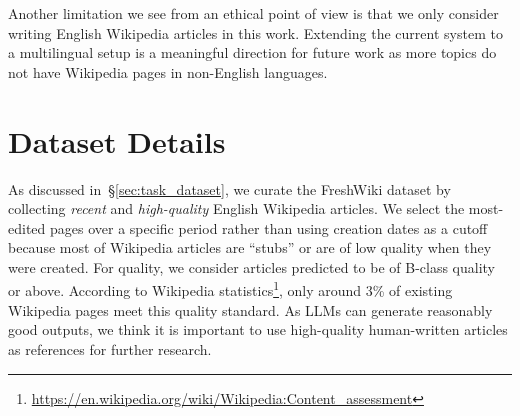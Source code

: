 \documentclass[11pt]{article}
\newcommand{\refsec}[1]{\S\ref{#1}} %
\begin{document}
Another limitation we see from an ethical point of view is that we only consider writing English Wikipedia articles in this work. Extending the current system to a multilingual setup is a meaningful direction for future work as more topics do not have Wikipedia pages in non-English languages.






\clearpage
\appendix

\label{sec:appendix}
\section{Dataset Details}
\label{appendix:dataset}


As discussed in~\refsec{sec:task_dataset}, we curate the FreshWiki dataset by collecting \textit{recent} and \textit{high-quality} English Wikipedia articles. We select the most-edited pages over a specific period rather than using creation dates as a cutoff because most of Wikipedia articles are ``stubs'' or are of low quality when they were created. For quality, we consider articles predicted to be of B-class quality or above. According to Wikipedia statistics\footnote{\url{https://en.wikipedia.org/wiki/Wikipedia:Content_assessment}}, only around 3\% of existing Wikipedia pages meet this quality standard. As LLMs can generate reasonably good outputs, we think it is important to use high-quality human-written articles as references for further research.

\begin{table}
\centering
{}
\caption{Statistics of the dataset used in our experiments.}
\label{table:data_statistics}
\end{table}
\end{document}

